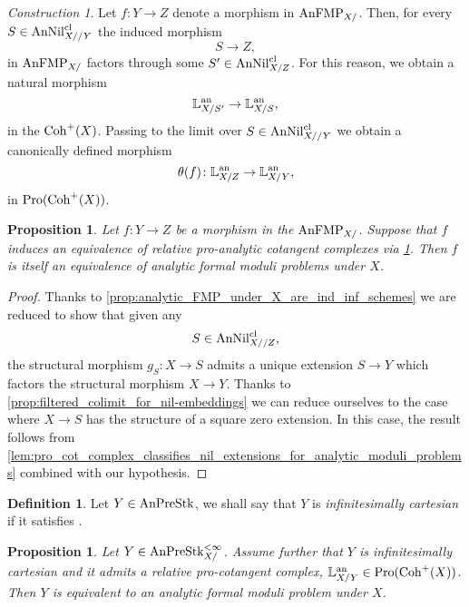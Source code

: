 \documentclass[10pt,a4paper,reqno]{amsart} %
\theoremstyle{plain}
\newtheorem{prop}[thm]{Proposition}
\theoremstyle{definition}
\newtheorem{defin}[thm]{Definition}
\theoremstyle{remark}
\numberwithin{equation}{section}
\newtheorem{construction}[thm]{Construction}
\begin{document}
\begin{construction} \label{rem:morphisms_of_AnFMP_induce_transition_morphisms_on_relative_analytic_cot_complexes}
    Let $f \colon Y \to Z$ denote a morphism in $\mathrm{AnFMP}_{X/}$. Then, for every $S \in \mathrm{AnNil}_{X//Y}^{\mathrm{cl}}$ the induced morphism
        \[
            S \to Z,   
        \]
    in $\mathrm{AnFMP}_{X/}$ factors through some $S' \in \mathrm{AnNil}^{\mathrm{cl}}_{X/Z}$. For this reason, we obtain a natural morphism
        \[
            \mathbb L^\mathrm{an}_{X/S'} \to \mathbb L^\mathrm{an}_{X/S},  
        \]
    in the \infcat $\mathrm{Coh}^+(X)$. Passing to the limit over $S \in \mathrm{AnNil}^{\mathrm{cl}}_{X//Y}$ we obtain a canonically defined morphism
        \[
            \theta (f) \colon \mathbb L^\mathrm{an}_{X/Z} \to \mathbb L^\mathrm{an}_{X/Y},  
        \]
    in $\mathrm{Pro}(\mathrm{Coh}^+(X))$.
\end{construction}

\begin{prop}
    Let $f \colon Y \to Z$ be a morphism in the \infcat $\mathrm{AnFMP}_{X/}$. Suppose that $f$ induces an equivalence of relative pro-analytic cotangent complexes via
    \cref{rem:morphisms_of_AnFMP_induce_transition_morphisms_on_relative_analytic_cot_complexes}.
    Then $f$ is itself an equivalence of analytic formal moduli problems under $X$.
\end{prop}

\begin{proof}
    Thanks to \cref{prop:analytic_FMP_under_X_are_ind_inf_schemes} we are reduced to show that given any
        \[
            S \in \mathrm{AnNil}_{X//Z}^{\mathrm{cl}},  
        \]
    the structural morphism $g_S \colon X \to S$ admits a unique extension $S \to Y$ which factors the structural morphism $X \to Y$. Thanks to
    \cref{prop:filtered_colimit_for_nil-embeddings} we can reduce ourselves to the case where $X \to S$ has the structure of
    a square zero extension. In this case, the result follows from \cref{lem:pro_cot_complex_classifies_nil_extensions_for_analytic_moduli_problems}
    combined with our hypothesis.
\end{proof}

\begin{defin}
    Let $Y \in \mathrm{AnPreStk}$, we shall say that $Y$ is \emph{infinitesimally cartesian} if it satisfies \cite[Definition 7.3]{Porta_Yu_Representability}.
\end{defin}

\begin{prop} \label{prop:sufficient_conditions_for_a_prestack_to_be_equiv_to_an_analytic_FMP}
    Let $Y \in \mathrm{AnPreStk}_{X/}^{< \infty}$. Assume further that $Y$ is infinitesimally cartesian and it admits a relative pro-cotangent complex, $\mathbb L_{X/Y}^\mathrm{an} \in \mathrm{Pro}(\mathrm{Coh}^+(X))$.
    Then $Y$ is equivalent to an analytic formal moduli problem under $X$.
\end{prop}
\end{document}
